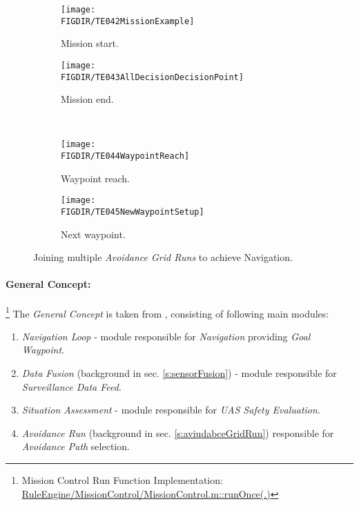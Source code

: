 \begin{figure}[H]
    \centering
    \begin{subfigure}{0.48\textwidth}
        \centering
        \texttt{[image: \\FIGDIR/TE042MissionExample]}
        \caption{Mission start.}
        \label{fig:missionExampleWithOAGR}
    \end{subfigure}
    \begin{subfigure}{0.48\textwidth}
    	\centering
        \texttt{[image: \\FIGDIR/TE043AllDecisionDecisionPoint]} 
        \caption{Mission end.}
        \label{fig:finishedMissionAGR}
    \end{subfigure}
    \\
    \centering
    \begin{subfigure}{0.48\textwidth}
        \centering
        \texttt{[image: \\FIGDIR/TE044WaypointReach]}
        \caption{Waypoint reach.}
        \label{fig:waypointReachAGR}
    \end{subfigure}
    \begin{subfigure}{0.48\textwidth}
    	\centering
        \texttt{[image: \\FIGDIR/TE045NewWaypointSetup]} 
        \caption{Next waypoint.}
        \label{fig:newtWaypointAGR}
    \end{subfigure}
    \caption{Joining multiple \emph{Avoidance Grid Runs} to achieve Navigation.}
    \label{fig:joiningMultipleAGRS}
    
\end{figure}
    

\newpage
\paragraph{General Concept:}\footnote{Mission Control Run Function Implementation: \url{RuleEngine/MissionControl/MissionControl.m::runOnce(.)}} The \emph{General Concept} is taken from  \cite{sabatini2014navigation,Sabatini2014}, consisting of following main modules:
\begin{enumerate}
    \item \emph{Navigation Loop} - module responsible for \emph{Navigation} providing \emph{Goal Waypoint}.
    
    \item \emph{Data Fusion} (background in sec. \ref{s:sensorFusion}) - module responsible for \emph{Surveillance Data Feed}.
    
    \item \emph{Situation Assessment} - module responsible for \emph{UAS Safety Evaluation}. 
    
    \item \emph{Avoidance Run} (background in sec. \ref{s:aviudabceGridRun}) responsible for \emph{Avoidance Path} selection.    
\end{enumerate}



